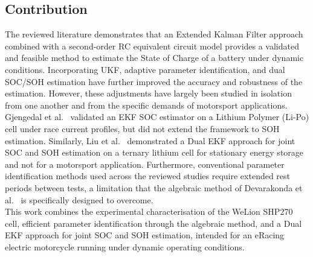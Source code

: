 \subsection{Contribution}

The reviewed literature demonstrates that an Extended Kalman Filter approach combined with a second-order RC 
equivalent circuit model provides a validated and feasible method to estimate the State of Charge of a battery 
under dynamic conditions. Incorporating \acs{UKF}, adaptive parameter identification, and dual \acs{SOC}/\acs{SOH} estimation have 
further improved the accuracy and robustness of the estimation. 
However, these adjustments have largely been studied in isolation from one another and from the specific demands of motorsport applications. 
Gjengedal et al.~\cite{BatteryKalmanRaceCar} validated an \acs{EKF} \acs{SOC} estimator on a Lithium Polymer (\acs{Li-Po}) cell under race 
current profiles, but 
did not extend the framework to \acs{SOH} estimation. Similarly, Liu et al.~\cite{SOCSOH} demonstrated a Dual \acs{EKF} approach for 
joint \acs{SOC} and \acs{SOH} estimation on a ternary lithium cell for stationary energy storage and not for a motorsport application.
Furthermore, conventional parameter identification methods used across the reviewed studies require extended rest periods 
between tests, a limitation that the algebraic method of Devarakonda et al.~\cite{DEVARAKONDA2014} is specifically designed to overcome.
\\
This work combines the experimental characterisation of the WeLion SHP270 cell, efficient parameter identification 
through the algebraic method, and a Dual \acs{EKF} approach for joint \acs{SOC} and \acs{SOH} estimation, intended for an eRacing 
electric motorcycle running under dynamic operating conditions.